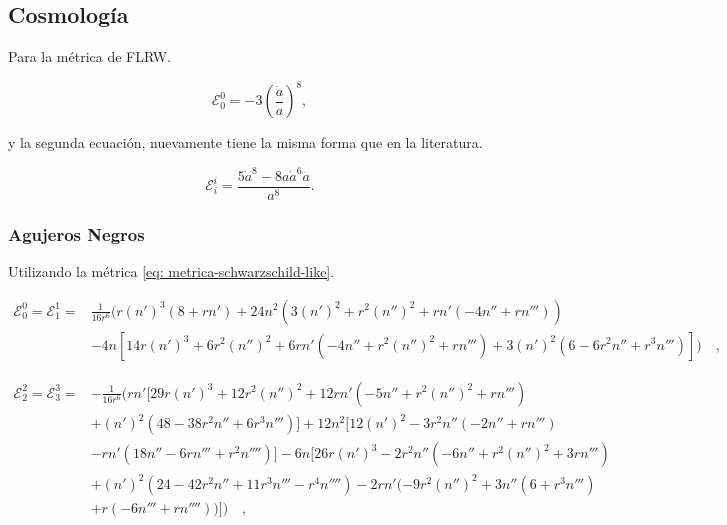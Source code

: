 \documentclass[12pt]{book}
\begin{document}
\subsection{Cosmología}
Para la métrica de FLRW.

\begin{equation}
    \mathcal{E}_0^0=-3\left(\frac{\dot{a}}{a}\right)^8 \label{eq: ResultadosReales - cuartico - FLRW - 00},
\end{equation}

\noindent y la segunda ecuación, nuevamente tiene la misma forma que en la literatura.

\begin{equation}
    \mathcal{E}_i^i=\frac{5\dot{a}^8-8a\dot{a}^6\ddot{a}}{a^8}\label{eq: ResultadosReales - cuartico - FLRW - ii}.
\end{equation}

\subsubsection{Agujeros Negros}
Utilizando la métrica \eqref{eq: metrica-schwarzschild-like}.

\begin{equation}
\begin{split}
    \mathcal{E}_0^0=\mathcal{E}_1^1=&\frac{1}{16 r^6}  ( r (n')^3 (8 + r n') + 24 n^2  ( 3 (n')^2 + r^2 (n'')^2 + r n' (-4 n'' + r n''')  )\\ & - 4 n  [ 14 r (n')^3 + 6 r^2 (n'')^2 + 6 r n'  ( -4 n'' + r^2 (n'')^2 + r n'''  ) + 3 (n')^2  ( 6 - 6 r^2 n'' + r^3 n'''  )  ]  )\label{eq: ResultadosReales - cuartico - BH - 00}\quad,
\end{split}
\end{equation}




\begin{equation}
\begin{split}
    \mathcal{E}_2^2=\mathcal{E}_3^3=& -\frac{1}{16 r^6} \Bigg( r n'  [ 29 r (n')^3 + 12 r^2 (n'')^2 + 12 r n'  ( -5 n'' + r^2 (n'')^2 + r n'''  )\\ & + (n')^2  ( 48 - 38 r^2 n'' + 6 r^3 n'''  )  ] + 12 n^2  [ 12 (n')^2 - 3 r^2 n'' (-2 n'' + r n''')\\ & - r n'  ( 18 n'' - 6 r n''' + r^2 n''''  )  ] - 6 n  [ 26 r (n')^3 - 2 r^2 n''  ( -6 n'' + r^2 (n'')^2 + 3 r n'''  )\\ & + (n')^2  ( 24 - 42 r^2 n'' + 11 r^3 n''' - r^4 n''''  ) - 2 r n'  ( -9 r^2 (n'')^2 + 3 n'' (6 + r^3 n''')\\ & + r (-6 n''' + r n'''')  )  ] \Bigg)\label{eq: ResultadosReales - cuartico - BH - 22}\quad,
\end{split}
\end{equation}
\end{document}
